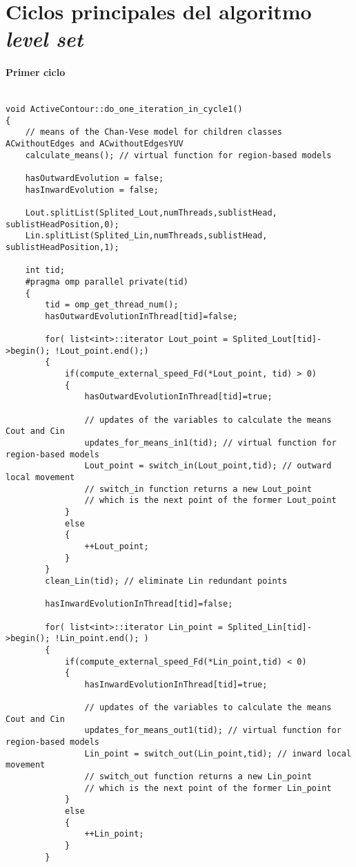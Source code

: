 \chapter{Ciclos principales del algoritmo \textit{level set}}\label{apendice1}


\subsubsection{Primer ciclo}
\begin{lstlisting}

void ActiveContour::do_one_iteration_in_cycle1()
{
	// means of the Chan-Vese model for children classes ACwithoutEdges and ACwithoutEdgesYUV
	calculate_means(); // virtual function for region-based models
	
	hasOutwardEvolution = false;
	hasInwardEvolution = false;
	
	Lout.splitList(Splited_Lout,numThreads,sublistHead, sublistHeadPosition,0);
	Lin.splitList(Splited_Lin,numThreads,sublistHead, sublistHeadPosition,1);
	
	int tid;
	#pragma omp parallel private(tid)
	{
		tid = omp_get_thread_num();
		hasOutwardEvolutionInThread[tid]=false;     
		
		for( list<int>::iterator Lout_point = Splited_Lout[tid]->begin(); !Lout_point.end();)
		{
			if(compute_external_speed_Fd(*Lout_point, tid) > 0)
			{
				hasOutwardEvolutionInThread[tid]=true;
			
				// updates of the variables to calculate the means Cout and Cin
				updates_for_means_in1(tid); // virtual function for region-based models
				Lout_point = switch_in(Lout_point,tid); // outward local movement
				// switch_in function returns a new Lout_point
				// which is the next point of the former Lout_point
			}
			else
			{
				++Lout_point;
			}
		}
		clean_Lin(tid); // eliminate Lin redundant points
		
		hasInwardEvolutionInThread[tid]=false;
		
		for( list<int>::iterator Lin_point = Splited_Lin[tid]->begin(); !Lin_point.end(); )
		{
			if(compute_external_speed_Fd(*Lin_point,tid) < 0)
			{
				hasInwardEvolutionInThread[tid]=true;
				
				// updates of the variables to calculate the means Cout and Cin
				updates_for_means_out1(tid); // virtual function for region-based models
				Lin_point = switch_out(Lin_point,tid); // inward local movement
				// switch_out function returns a new Lin_point
				// which is the next point of the former Lin_point
			}
			else
			{
				++Lin_point;
			}
		}
		

\end{lstlisting}
